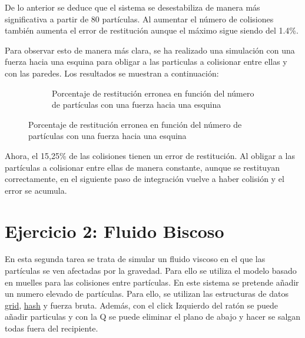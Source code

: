 \documentclass{article}
\begin{document}
De lo anterior se deduce que el sistema se desestabiliza de manera más significativa a partir de 80 partículas. Al aumentar el número de colisiones también aumenta el error de restitución aunque el máximo sigue siendo del 1.4\%.

Para observar esto de manera más clara, se ha realizado una simulación con una fuerza hacia una esquina para obligar a las particulas a colisionar entre ellas y con las paredes. Los resultados se muestran a continuación:
\begin{figure}[H]
    \centering
    \begin{subfigure}{0.48\textwidth}
        \centering
        \caption{Porcentaje de restitución erronea en función del número de partículas con una fuerza hacia una esquina}

        \label{fig:restitution_error_billiard_B}
    \end{subfigure}
\end{figure}

Ahora, el 15,25\% de las colisiones tienen un error de restitución. Al obligar a las partículas a colisionar entre ellas de manera constante, aunque se restituyan correctamente, en el siguiente paso de integración vuelve a haber colisión y el error se acumula.

\section{Ejercicio 2: Fluido Biscoso}\label{sec:fluido-biscoso}

En esta segunda tarea se trata de simular un fluido viscoso en el que las partículas se ven afectadas por la gravedad. Para ello se utiliza el modelo basado en muelles para las colisiones entre partículas. En este sistema se pretende añadir un numero elevado de partículas. Para ello, se utilizan las estructuras de datos \hyperref[sec:grid]{grid}, \hyperref[sec:hash]{hash} y fuerza bruta. Además, con el click Izquierdo del ratón se puede añadir particulas y con la Q se puede eliminar el plano de abajo y hacer se salgan todas fuera del recipiente.
\end{document}
